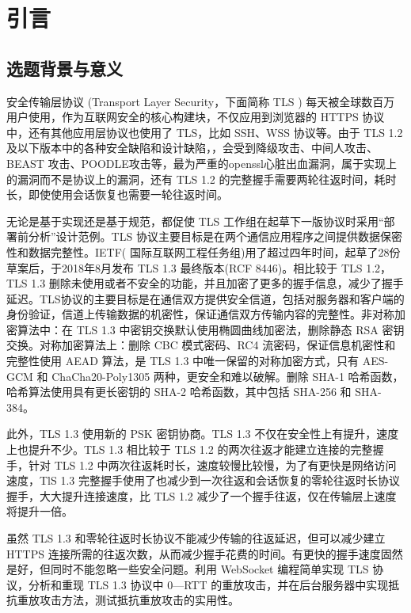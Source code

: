 \section{引言}

\subsection{选题背景与意义}
\label{sec:background}
  安全传输层协议 (Transport Layer Security，下面简称 TLS ) 每天被全球数百万用户使用，作为互联网安全的核心构建块，不仅应用到浏览器的 HTTPS 协议中，还有其他应用层协议也使用了 TLS，比如 SSH、WSS 协议等。由于 TLS 1.2 及以下版本中的各种安全缺陷和设计缺陷\cite{7877537}，\cite{8632026}，会受到降级攻击、中间人攻击、BEAST 攻击、POODLE攻击等，最为严重的openssl心脏出血漏洞\cite{8001980}，属于实现上的漏洞而不是协议上的漏洞，还有 TLS 1.2 的完整握手需要两轮往返时间，耗时长，即使使用会话恢复也需要一轮往返时间。
  
  无论是基于实现还是基于规范，都促使 TLS 工作组在起草下一版协议时采用“部署前分析”设计范例\cite{7546518}。TLS 协议主要目标是在两个通信应用程序之间提供数据保密性和数据完整性。IETF( 国际互联网工程任务组)用了超过四年时间，起草了28份草案后，于2018年8月发布 TLS 1.3\cite{RFC8446} 最终版本(RCF 8446)。相比较于 TLS 1.2，TLS 1.3 删除未使用或者不安全的功能，并且加密了更多的握手信息，减少了握手延迟。TLS协议的主要目标是在通信双方提供安全信道，包括对服务器和客户端的身份验证，信道上传输数据的机密性，保证通信双方传输内容的完整性。非对称加密算法中：在 TLS 1.3 中密钥交换默认使用椭圆曲线加密法，删除静态 RSA 密钥交换。对称加密算法上：删除 CBC 模式密码、RC4 流密码，保证信息机密性和完整性使用 AEAD 算法\cite{RFC5166}，是 TLS 1.3 中唯一保留的对称加密方式，只有 AES-GCM 和 ChaCha20-Poly1305 两种，更安全和难以破解。删除 SHA-1 哈希函数，哈希算法使用具有更长密钥的 SHA-2 哈希函数，其中包括 SHA-256 和 SHA-384。
  
  此外，TLS 1.3 使用新的 PSK 密钥协商。TLS 1.3 不仅在安全性上有提升，速度上也提升不少。TLS 1.3 相比较于 TLS 1.2 的两次往返才能建立连接的完整握手，针对 TLS 1.2 中两次往返耗时长，速度较慢比较慢，为了有更快是网络访问速度，TlS 1.3 完整握手使用了也减少到一次往返和会话恢复的零轮往返时长协议握手，大大提升连接速度，比 TLS 1.2 减少了一个握手往返，仅在传输层上速度将提升一倍。
  
  虽然 TLS 1.3 和零轮往返时长协议不能减少传输的往返延迟，但可以减少建立 HTTPS 连接所需的往返次数，从而减少握手花费的时间。有更快的握手速度固然是好，但同时不能忽略一些安全问题。利用 WebSocket 编程简单实现 TLS 协议，分析和重现 TLS 1.3 协议中 0—RTT 的重放攻击，并在后台服务器中实现抵抗重放攻击方法，测试抵抗重放攻击的实用性。

